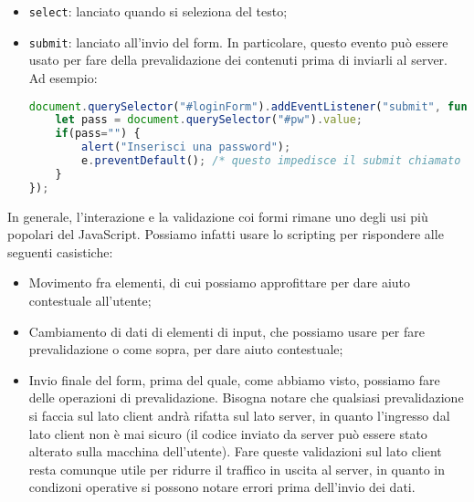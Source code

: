 \documentclass[a4paper,11pt]{article}
\begin{document}
\begin{itemize}
\begin{itemize}
			\item \lstinline|select|: lanciato quando si seleziona del testo;
			\item \lstinline|submit|: lanciato all'invio del form. In particolare, questo evento può essere usato per fare della prevalidazione dei contenuti prima di inviarli al server. Ad esempio:
\begin{lstlisting}[language=javascript, style=codestyle]	
document.querySelector("#loginForm").addEventListener("submit", function(e) {
	let pass = document.querySelector("#pw").value;
	if(pass="") {
		alert("Inserisci una password");
		e.preventDefault(); /* questo impedisce il submit chiamato dall'utente */
	}
});
\end{lstlisting}
		\end{itemize}

	In generale, l'interazione e la validazione coi formi rimane uno degli usi più popolari del JavaScript.
	Possiamo infatti usare lo scripting per rispondere alle seguenti casistiche:
	\begin{itemize}
		\item Movimento fra elementi, di cui possiamo approfittare per dare aiuto contestuale all'utente;
		\item Cambiamento di dati di elementi di input, che possiamo usare per fare prevalidazione o come sopra, per dare aiuto contestuale;
		\item Invio finale del form, prima del quale, come abbiamo visto, possiamo fare delle operazioni di prevalidazione.
			Bisogna notare che qualsiasi prevalidazione si faccia sul lato client andrà rifatta sul lato server, in quanto l'ingresso dal lato client non è mai sicuro (il codice inviato da server può essere stato alterato sulla macchina dell'utente).
			Fare queste validazioni sul lato client resta comunque utile per ridurre il traffico in uscita al server, in quanto in condizoni operative si possono notare errori prima dell'invio dei dati.
	\end{itemize}


\end{itemize}
\end{document}
